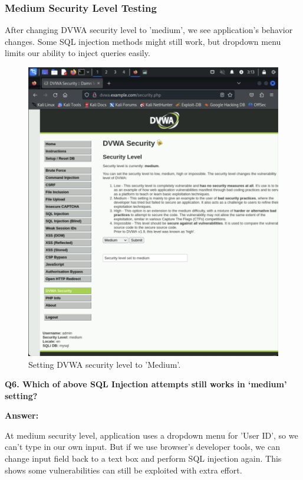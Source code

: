 \documentclass[12pt]{article}
\begin{document}
\subsubsection{Medium Security Level Testing}

After changing DVWA security level to 'medium', we see application's behavior changes. Some SQL injection methods might still work, but dropdown menu limits our ability to inject queries easily.

\begin{figure}[H]
    \centering
    \includegraphics[width=1.0\textwidth]{Screenshot7.png}
    \caption{Setting DVWA security level to 'Medium'.}
\end{figure}

\textbf{Q6. Which of above SQL Injection attempts still works in ‘medium’ setting?}

\textbf{Answer:}

At medium security level, application uses a dropdown menu for 'User ID', so we can't type in our own input. But if we use browser's developer tools, we can change input field back to a text box and perform SQL injection again. This shows some vulnerabilities can still be exploited with extra effort.
\end{document}
